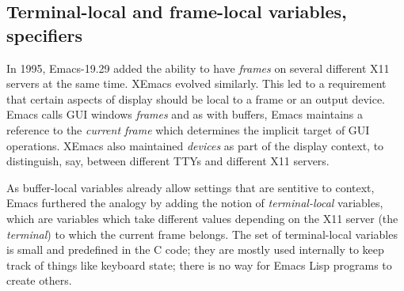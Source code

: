 \documentclass[format=acmsmall, review]{acmart}
\newcommand \Elisp {Emacs Lisp}
\begin{document}








\subsection{Terminal-local and frame-local variables, specifiers}

In 1995, Emacs-19.29 added the ability to have \emph{frames} on
several different X11 servers at the same time.  XEmacs evolved
similarly.  This led to a requirement that certain aspects of display
should be local to a frame or an output device.  Emacs calls GUI
windows \emph{frames} and as with buffers, Emacs maintains a reference
to the \emph{current frame} which determines the implicit target of
GUI operations.  XEmacs also maintained \emph{devices} as part of
the display context, to distinguish, say, between different TTYs and
different X11 servers.

As buffer-local variables already allow settings that are sentitive to
context, Emacs furthered the analogy by adding the notion of
\emph{terminal-local} variables, which are variables which take
different values depending on the X11 server (the \emph{terminal}) to
which the current frame belongs.  The set of terminal-local variables
is small and predefined in the C code; they are mostly used internally
to keep track of things like keyboard state; there is no way for
\Elisp{} programs to create others.
\end{document}
